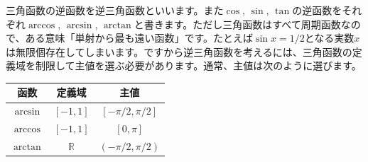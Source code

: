 三角函数の逆函数を逆三角函数といいます。また$\cos$, $\sin$, $\tan$の逆函数をそれぞれ$\arccos$, $\arcsin$, $\arctan$と書きます。ただし三角函数はすべて周期函数なので、ある意味「単射から最も遠い函数」です。たとえば$\sin x = 1/2$となる実数$x$は無限個存在してしまいます。ですから逆三角函数を考えるには、三角函数の定義域を制限して主値を選ぶ必要があります。通常、主値は次のように選びます。

\begin{table}[h!tbp]
\begin{center}
\begin{tabular}{ccc} \hline
函数 & 定義域 & 主値 \\ \hline
$\arcsin$ & $[-1,1]$ & $[-\pi/2,\pi/2]$ \\
$\arccos$ & $[-1,1]$ & $[0,\pi]$ \\
$\arctan$ & $\mathbb{R}$ & $(-\pi/2,\pi/2)$ \\ \hline
\end{tabular}
\end{center}
\end{table}

